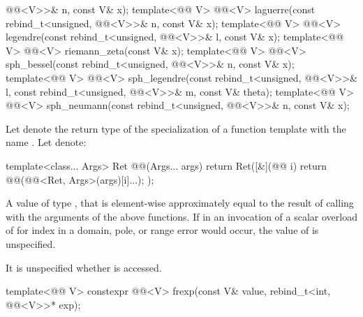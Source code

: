 \begin{itemdecl}
@@<V>>& n, const V& x);
template<@@ V> @@<V> laguerre(const rebind_t<unsigned,
@@<V>>& n, const V& x);
template<@@ V> @@<V> legendre(const rebind_t<unsigned,
@@<V>>& l, const V& x);
template<@@ V> @@<V> riemann_zeta(const V& x);
template<@@ V> @@<V> sph_bessel(const rebind_t<unsigned,
@@<V>>& n, const V& x);
template<@@ V>
  @@<V> sph_legendre(const rebind_t<unsigned, @@<V>>& l,
                                 const rebind_t<unsigned, @@<V>>& m,
                                 const V& theta);
template<@@ V> @@<V> sph_neumann(const rebind_t<unsigned,
@@<V>>& n, const V& x);
\end{itemdecl}

\begin{itemdescr}
\pnum
Let  denote the return type of the specialization of a function
template with the name .
Let  denote:
\begin{codeblock}
template<class... Args>
Ret @@(Args... args) {
  return Ret([&](@@ i) {
    return @@(@@<Ret, Args>(args)[i]...);
  });
}
\end{codeblock}

\pnum
\returns
A value  of type , that is element-wise approximately
equal to the result of calling  with the arguments
of the above functions.
If in an invocation of a scalar overload of  for index
 in  a domain, pole, or range error would
occur, the value of  is unspecified.

\pnum
\remarks
It is unspecified whether  is accessed.
\end{itemdescr}

\begin{itemdecl}
template<@@ V>
  constexpr @@<V> frexp(const V& value, rebind_t<int, @@<V>>* exp);
\end{itemdecl}

